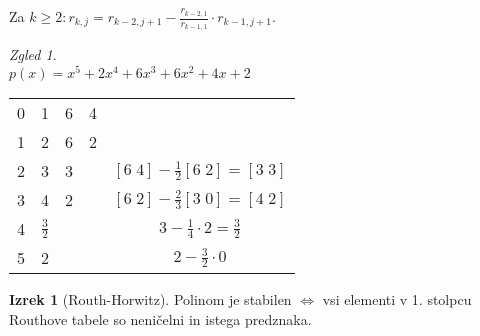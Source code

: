 \documentclass[a4paper, 12pt]{book}
\theoremstyle{definition}
\newtheorem{theorem}[counter]{Izrek}
\theoremstyle{remark}
\newtheorem*{exmp}{Zgled}
\begin{document}
Za $k \geq 2: r_{k,j} = r_{k-2,j+1} - \frac{r_{k-2,1}}{r_{k-1,1}} \cdot r_{k-1,j+1}$.
\begin{exmp} \text{} \\
  $p(x) = x^5 + 2x^4 + 6x^3 + 6x^2 + 4x + 2$
  \begin{center}
      \begin{tabular}{c | c c c c}
          & & & & \\
          \hline
          0 & 1 & 6 & 4 & \\
          1 & 2 & 6 & 2 & \\
          2 & 3 & 3 & & $[6 \; 4] - \frac{1}{2} [6 \; 2] = [3 \; 3]$ \\
          3 & 4 & 2 & & $[6 \; 2] - \frac{2}{3} [3 \; 0] = [4 \; 2]$ \\
          4 & $\frac{3}{2}$ & & & $3 - \frac{1}{4} \cdot 2 = \frac{3}{2}$ \\
          5 & 2 & & & $2 - \frac{3}{2} \cdot 0$
      \end{tabular}
  \end{center}
\end{exmp}
\begin{theorem}[Routh-Horwitz]
  Polinom  je stabilen $\iff$
  vsi elementi v 1. stolpcu Routhove tabele so neničelni in istega predznaka.
\end{theorem}




%
%



\end{document}
